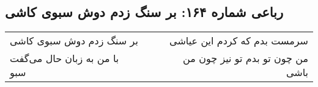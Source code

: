 \begin{center}
\section*{رباعی شماره ۱۶۴: بر سنگ زدم دوش سبوی کاشی}
\label{sec:sh164}
\begin{longtable}{l p{0.5cm} r}
بر سنگ زدم دوش سبوی کاشی
&&
سرمست بدم که کردم این عیاشی
\\
با من به زبان حال می‌گفت سبو
&&
من چون تو بدم تو نیز چون من باشی
\\
\end{longtable}
\end{center}
